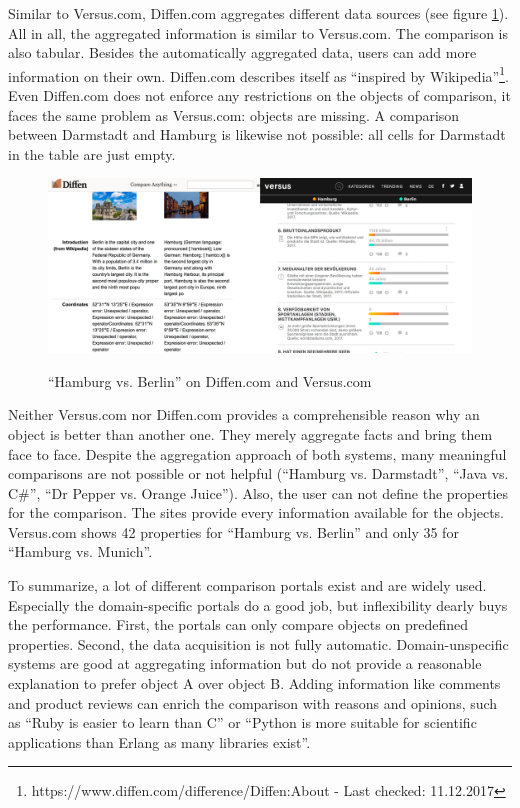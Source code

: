 Similar to Versus.com, Diffen.com aggregates different data sources (see figure \ref{img:diffversus}). All in all, the aggregated information is similar to Versus.com. The comparison is also tabular. Besides the automatically aggregated data, users can add more information on their own. Diffen.com describes itself as \enquote{inspired by Wikipedia}\footnote{https://www.diffen.com/difference/Diffen:About - Last checked: 11.12.2017}. Even Diffen.com does not enforce any restrictions on the objects of comparison, it faces the same problem as Versus.com: objects are missing. A comparison between Darmstadt and Hamburg is likewise not possible: all cells for Darmstadt in the table are just empty.\newline

\begin{figure}[h]
\includegraphics[width=1\textwidth]{images/ds-sys/diffversus}
\label{img:diffversus}
\caption{\enquote{Hamburg vs. Berlin} on Diffen.com and Versus.com}
\end{figure}

Neither Versus.com nor Diffen.com provides a comprehensible reason why an object is better than another one. They merely aggregate facts and bring them face to face. Despite the aggregation approach of both systems, many meaningful comparisons are not possible or not helpful (\enquote{Hamburg vs. Darmstadt}, \enquote{Java vs. C\#}, \enquote{Dr Pepper vs. Orange Juice}).
Also, the user can not define the properties for the comparison. The sites provide every information available for the objects. Versus.com shows 42 properties for \enquote{Hamburg vs. Berlin} and only 35 for \enquote{Hamburg vs. Munich}.
\newline

To summarize, a lot of different comparison portals exist and are widely used. Especially the domain-specific portals do a good job, but inflexibility dearly buys the performance. First, the portals can only compare objects on predefined properties. Second, the data acquisition is not fully automatic. Domain-unspecific systems are good at aggregating information but do not provide a reasonable explanation to prefer object A over object B. Adding information like comments and product reviews can enrich the comparison with reasons and opinions, such as \enquote{Ruby is easier to learn than C} or \enquote{Python is more suitable for scientific applications than Erlang as many libraries exist}.